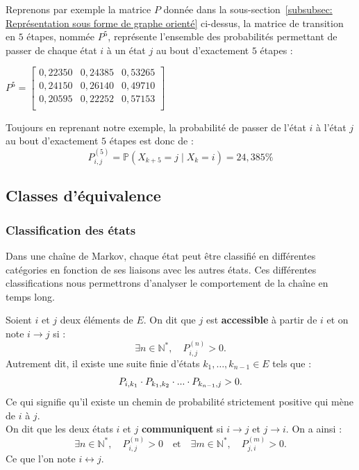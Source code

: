 \documentclass{article}
\begin{document}
\begin{tcolorbox}[colback=white,colframe=yellow!80!black,title=Exemple, breakable]
Reprenons par exemple la matrice $P$ donnée dans la sous-section~\ref{subsubsec: Représentation sous forme de graphe orienté} ci-dessus, la matrice de transition en $5$ étapes, nommée $P^{5}$, représente l'ensemble des probabilités permettant de passer de chaque état $i$ à un état $j$ au bout d'exactement $5$ étapes :
\begin{center}
$
P^{5} = \begin{bmatrix}
0,22350 & 0,24385 & 0,53265 \\
0,24150 & 0,26140 & 0,49710 \\
0,20595 & 0,22252 & 0,57153 \\
\end{bmatrix}
$
\end{center}
Toujours en reprenant notre exemple, la probabilité de passer de l'état $i$ à l'état $j$ au bout d'exactement $5$ étapes est donc de :
\[
P_{i,j}^{(5)} = \mathbb{P}(X_{k+5} = j \mid X_k = i) = 24,385\%
\]
\end{tcolorbox}

\newpage %
\subsection{Classes d'équivalence}

\subsubsection{Classification des états}
\label{subsubsec: Les différents types d'états}

Dans une chaîne de Markov, chaque état peut être classifié en différentes catégories en fonction de ses liaisons avec les autres états. Ces différentes classifications nous permettrons d'analyser le comportement de la chaîne en temps long. \\

\begin{tcolorbox}[colback=white,colframe=red!80!black,title=Accessibilité et communication]
Soient $i$ et $j$ deux éléments de $E$. On dit que $j$ est \textbf{accessible} à partir de $i$ et on note $i \to j$ si :
\[
\exists n \in \mathbb{N}^{*}, \quad P_{i,j}^{(n)} > 0.
\]
Autrement dit, il existe une suite finie d'états $k_1, \dots, k_{n-1} \in E$ tels que :
\[
P_{i,k_1} \cdot P_{k_1,k_2}\cdot ... \cdot P_{k_{n-1},j} > 0. \\
\]
Ce qui signifie qu'il existe un chemin de probabilité strictement positive qui mène de $i$ à $j$. \\

On dit que les deux états $i$ et $j$ \textbf{communiquent} si $i \rightarrow j$ et $j \rightarrow i$. On a ainsi :
\[
\exists n \in \mathbb{N}^{*}, \quad P_{i,j}^{(n)} > 0 \quad \text{et} \quad \exists m \in \mathbb{N}^{*}, \quad P_{j,i}^{(m)} > 0.
\]
Ce que l'on note $i \leftrightarrow j$.
\end{tcolorbox}
\end{document}
